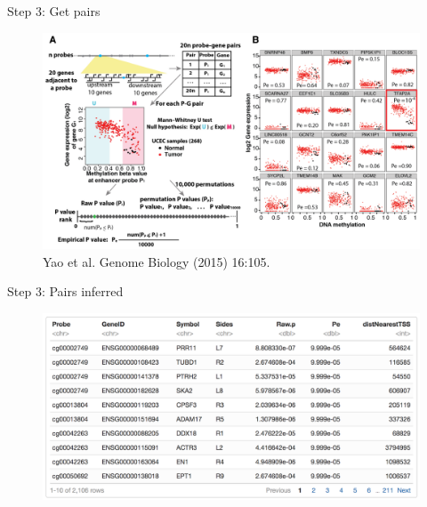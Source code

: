 \documentclass[slidestop,compress,11pt,xcolor=dvipsnames]{beamer}
\begin{document}
\begin{frame}{Step 3: Get pairs}
 \vspace*{-0.3cm}
 \begin{figure}
  \centering
  \includegraphics[width=1.0\linewidth]{ELMER/pair.png}{\tiny{\\Yao et al. Genome Biology (2015) 16:105.}}
 \end{figure}
\end{frame}



\begin{frame}{Step 3: Pairs inferred}
 \begin{figure}
  \centering
  \includegraphics[width=1.0\linewidth]{ELMER/pairs_tbl.png}
 \end{figure}
\end{frame}
\end{document}
